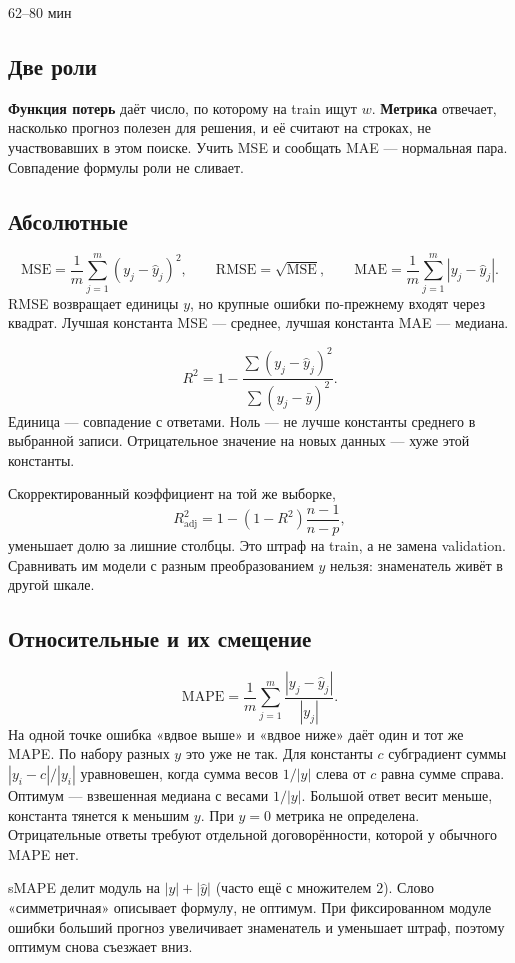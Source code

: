 \documentclass[11pt,a4paper]{article}
\newcommand{\term}[1]{\textbf{\color{navy}#1}}
\newcommand{\timing}[1]{\hfill{\small\color{blue}#1}}
\begin{document}
\timing{62--80 мин}

\subsection{Две роли}

\term{Функция потерь} даёт число, по которому на train ищут \(w\). \term{Метрика} отвечает, насколько прогноз полезен для решения, и её считают на строках, не участвовавших в этом поиске. Учить MSE и сообщать MAE --- нормальная пара. Совпадение формулы роли не сливает.

\subsection{Абсолютные}

\[
\mathrm{MSE}=\frac{1}{m}\sum_{j=1}^{m}(y_j-\hat y_j)^{2},\qquad
\mathrm{RMSE}=\sqrt{\mathrm{MSE}},\qquad
\mathrm{MAE}=\frac{1}{m}\sum_{j=1}^{m}|y_j-\hat y_j|.
\]
RMSE возвращает единицы \(y\), но крупные ошибки по-прежнему входят через квадрат. Лучшая константа MSE --- среднее, лучшая константа MAE --- медиана.

\[
R^{2}=1-\frac{\sum(y_j-\hat y_j)^{2}}{\sum(y_j-\bar y)^{2}}.
\]
Единица --- совпадение с ответами. Ноль --- не лучше константы среднего в выбранной записи. Отрицательное значение на новых данных --- хуже этой константы.

Скорректированный коэффициент на той же выборке,
\[
R^{2}_{\mathrm{adj}}=1-(1-R^{2})\frac{n-1}{n-p},
\]
уменьшает долю за лишние столбцы. Это штраф на train, а не замена validation. Сравнивать им модели с разным преобразованием \(y\) нельзя: знаменатель живёт в другой шкале.

\subsection{Относительные и их смещение}

\[
\mathrm{MAPE}=\frac{1}{m}\sum_{j=1}^{m}\frac{|y_j-\hat y_j|}{|y_j|}.
\]
На одной точке ошибка «вдвое выше» и «вдвое ниже» даёт один и тот же MAPE. По набору разных \(y\) это уже не так. Для константы \(c\) субградиент суммы \(|y_i-c|/|y_i|\) уравновешен, когда сумма весов \(1/|y|\) слева от \(c\) равна сумме справа. Оптимум --- взвешенная медиана с весами \(1/|y|\). Большой ответ весит меньше, константа тянется к меньшим \(y\). При \(y=0\) метрика не определена. Отрицательные ответы требуют отдельной договорённости, которой у обычного MAPE нет.

sMAPE делит модуль на \(|y|+|\hat y|\) (часто ещё с множителем \(2\)). Слово «симметричная» описывает формулу, не оптимум. При фиксированном модуле ошибки больший прогноз увеличивает знаменатель и уменьшает штраф, поэтому оптимум снова съезжает вниз.
\end{document}
